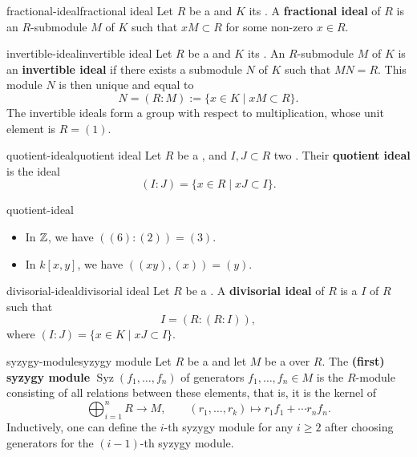 \begin{topic}{fractional-ideal}{fractional ideal}
    Let $R$ be a  and $K$ its . A \textbf{fractional ideal} of $R$ is an $R$-submodule $M$ of $K$ such that $xM \subset R$ for some non-zero $x \in R$.
\end{topic}

\begin{topic}{invertible-ideal}{invertible ideal}
    Let $R$ be a  and $K$ its . An $R$-submodule $M$ of $K$ is an \textbf{invertible ideal} if there exists a submodule $N$ of $K$ such that $MN = R$. This module $N$ is then unique and equal to
    \[ N = (R : M) := \{ x \in K \mid xM \subset R \} . \]
    The invertible ideals form a group with respect to multiplication, whose unit element is $R = (1)$.
\end{topic}

\begin{topic}{quotient-ideal}{quotient ideal}
    Let $R$ be a , and $I, J \subset R$ two . Their \textbf{quotient ideal} is the ideal
    \[ (I : J) = \{ x \in R \mid xJ \subset I \} . \]
\end{topic}

\begin{example}{quotient-ideal}
    \begin{itemize}
        \item In $\mathbb{Z}$, we have $((6) : (2)) = (3)$.
        \item In $k[x, y]$, we have $((xy), (x)) = (y)$.
    \end{itemize}
\end{example}

\begin{topic}{divisorial-ideal}{divisorial ideal}
    Let $R$ be a . A \textbf{divisorial ideal} of $R$ is a  $I$ of $R$ such that
    \[ I = (R : (R : I)) , \]
    where $(I : J) = \{ x \in K \mid xJ \subset I \}$.
\end{topic}

\begin{topic}{syzygy-module}{syzygy module}
    Let $R$ be a  and let $M$ be a  over $R$. The \textbf{(first) syzygy module} $\operatorname{Syz}(f_1, \ldots, f_n)$ of generators $f_1, \ldots, f_n \in M$ is the $R$-module consisting of all relations between these elements, that is, it is the kernel of
    \[ \bigoplus_{i = 1}^{n} R \to M, \qquad (r_1, \ldots, r_k) \mapsto r_1 f_1 + \cdots r_n f_n . \]
    Inductively, one can define the $i$-th syzygy module for any $i \ge 2$ after choosing generators for the $(i - 1)$-th syzygy module.
\end{topic}

